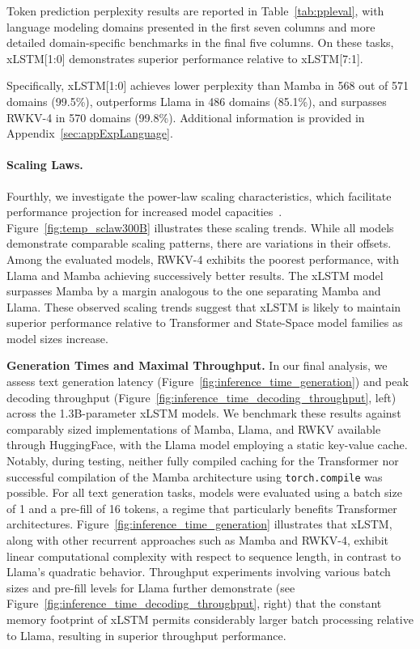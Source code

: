 Token prediction perplexity results are reported in Table~\ref{tab:ppleval}, with language modeling domains presented in the first seven columns and more detailed domain-specific benchmarks in the final five columns. On these tasks, xLSTM[1:0] demonstrates superior performance relative to xLSTM[7:1].

Specifically, xLSTM[1:0] achieves lower perplexity than Mamba in 568 out of 571 domains (99.5\%), outperforms Llama in 486 domains (85.1\%), and surpasses RWKV-4 in 570 domains (99.8\%). Additional information is provided in Appendix~\ref{sec:appExpLanguage}.

\paragraph{Scaling Laws.} Fourthly, we investigate the power-law scaling characteristics, which facilitate performance projection for increased model capacities~\citep{Kaplan:20,Brown:20short}. Figure~\ref{fig:temp_sclaw300B} illustrates these scaling trends. While all models demonstrate comparable scaling patterns, there are variations in their offsets. Among the evaluated models, RWKV-4 exhibits the poorest performance, with Llama and Mamba achieving successively better results. The xLSTM model surpasses Mamba by a margin analogous to the one separating Mamba and Llama. These observed scaling trends suggest that xLSTM is likely to maintain superior performance relative to Transformer and State-Space model families as model sizes increase.

\textbf{Generation Times and Maximal Throughput.} In our final analysis, we assess text generation latency (Figure~\ref{fig:inference_time_generation}) and peak decoding throughput (Figure~\ref{fig:inference_time_decoding_throughput}, left) across the 1.3B-parameter xLSTM models. We benchmark these results against comparably sized implementations of Mamba, Llama, and RWKV available through HuggingFace, with the Llama model employing a static key-value cache. Notably, during testing, neither fully compiled caching for the Transformer nor successful compilation of the Mamba architecture using \texttt{torch.compile} was possible. For all text generation tasks, models were evaluated using a batch size of 1 and a pre-fill of 16 tokens, a regime that particularly benefits Transformer architectures. Figure~\ref{fig:inference_time_generation} illustrates that xLSTM, along with other recurrent approaches such as Mamba and RWKV-4, exhibit linear computational complexity with respect to sequence length, in contrast to Llama’s quadratic behavior. Throughput experiments involving various batch sizes and pre-fill levels for Llama further demonstrate (see Figure~\ref{fig:inference_time_decoding_throughput}, right) that the constant memory footprint of xLSTM permits considerably larger batch processing relative to Llama, resulting in superior throughput performance.

